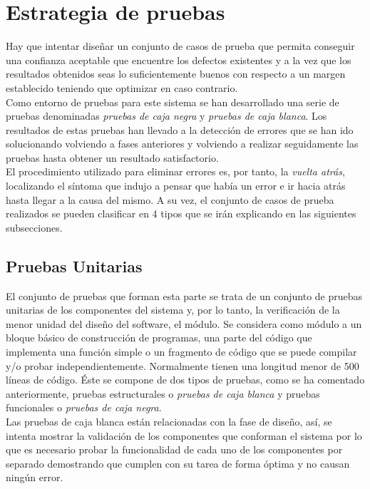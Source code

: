 	\section{Estrategia de pruebas}
	
		Hay que intentar diseñar un conjunto de casos de prueba que permita conseguir una confianza aceptable que encuentre los defectos existentes y a la vez que los resultados obtenidos seas lo suficientemente buenos con respecto a un margen establecido teniendo que optimizar en caso contrario.\\
		
		Como entorno de pruebas para este sistema se han desarrollado una serie de pruebas denominadas \textit{pruebas de caja negra} y \textit{pruebas de caja blanca}. Los resultados de estas pruebas han llevado a la detección de errores que se han ido solucionando volviendo a fases anteriores y volviendo a realizar seguidamente las pruebas hasta obtener un resultado satisfactorio.\\
		
		El procedimiento utilizado para eliminar errores es, por tanto, la \textit{vuelta atrás}, localizando el síntoma que indujo a pensar que había un error e ir hacia atrás hasta llegar a la causa del mismo. A su vez, el conjunto de casos de prueba realizados se pueden clasificar en 4 tipos que se irán explicando en las siguientes subsecciones.
		
		\subsection{Pruebas Unitarias}

			El conjunto de pruebas que forman esta parte se trata de un conjunto de pruebas unitarias de los componentes del sistema y, por lo tanto, la verificación de la menor unidad del diseño del software, el módulo. Se considera como módulo a un bloque básico de construcción de programas, una parte del código que implementa una función simple o un fragmento de código que se puede compilar y/o probar independientemente. Normalmente tienen una longitud menor de 500 líneas de código. Éste se compone de dos tipos de pruebas, como se ha comentado anteriormente, pruebas estructurales o \textit{pruebas de caja blanca} y pruebas funcionales o \textit{pruebas de caja negra}.\\
			
			Las pruebas de caja blanca están relacionadas con la fase de diseño, así, se intenta mostrar la validación de los componentes que conforman el sistema por lo que es necesario probar la funcionalidad de cada uno de los componentes por separado demostrando que cumplen con su tarea de forma óptima y no causan ningún error.\\
			
